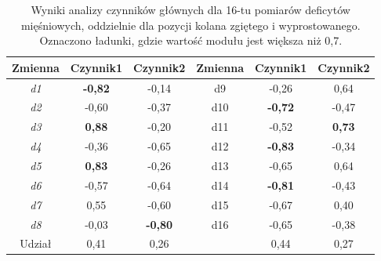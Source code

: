\begin{table}[h!]
	\centering
	\setlength{\tabcolsep}{3pt}
	\setlength\extrarowheight{2pt}
	\caption{Wyniki analizy czynników głównych dla 16-tu pomiarów deficytów mięśniowych, oddzielnie dla pozycji kolana zgiętego i wyprostowanego. Oznaczono ładunki, gdzie wartość modułu jest większa niż 0,7.}
	\label{tab:pca-muscles-knee-strait-bended}
	\begin{tabular}{c|c|c||c|c|c}
		
		Zmienna&Czynnik1&Czynnik2&Zmienna&Czynnik1&Czynnik2 \\
		\hline \hline
		\textit{d1}&\textbf{-0,82}&-0,14&d9&-0,26&0,64 \\
		\hline
		\textit{d2}&-0,60&-0,37&d10&\textbf{-0,72}&-0,47 \\
		\hline
		\textit{d3}&\textbf{0,88}&-0,20&d11&-0,52&\textbf{0,73} \\
		\hline
		\textit{d4}&-0,36&-0,65&d12&\textbf{-0,83}&-0,34 \\
		\hline
		\textit{d5}&\textbf{0,83}&-0,26&d13&-0,65&0,64 \\
		\hline
		\textit{d6}&-0,57&-0,64&d14&\textbf{-0,81}&-0,43 \\
		\hline
		\textit{d7}&0,55&-0,60&d15&-0,67&0,40 \\
		\hline
		\textit{d8}&-0,03&\textbf{-0,80}&d16&-0,65&-0,38 \\
		\hline\hline
		Udział&0,41&0,26&&0,44&0,27 \\
		
	\end{tabular}
\end{table}

